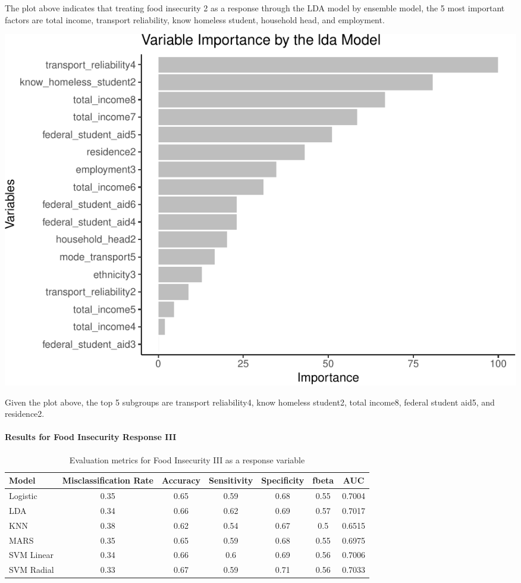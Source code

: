 \documentclass[
  10pt,
]{article}
\begin{document}
\hfill\break
The plot above indicates that treating food insecurity 2 as a response through the LDA model by ensemble model, the 5 most important factors are total income, transport reliability, know homeless student, household head, and employment.\\

\begin{center}\includegraphics{phase2_report_files/figure-latex/unnamed-chunk-24-1} \end{center}

\hfill\break
Given the plot above, the top 5 subgroups are transport reliability4, know homeless student2, total income8, federal student aid5, and residence2.\\

\hypertarget{results-for-food-insecurity-response-iii}{%
\paragraph{Results for Food Insecurity Response III}\label{results-for-food-insecurity-response-iii}}

\newline

\begin{table}[H]

\caption{\label{tab:unnamed-chunk-25}Evaluation metrics for Food Insecurity III  as a response variable}
\centering
\fontsize{12}{14}\selectfont
\begin{tabular}[t]{lcccccc}
\toprule
Model & Misclassification Rate & Accuracy & Sensitivity & Specificity & fbeta & AUC\\
\midrule
Logistic & 0.35 & 0.65 & 0.59 & 0.68 & 0.55 & 0.7004\\
LDA & 0.34 & 0.66 & 0.62 & 0.69 & 0.57 & 0.7017\\
KNN & 0.38 & 0.62 & 0.54 & 0.67 & 0.5 & 0.6515\\
MARS & 0.35 & 0.65 & 0.59 & 0.68 & 0.55 & 0.6975\\
SVM Linear & 0.34 & 0.66 & 0.6 & 0.69 & 0.56 & 0.7006\\
SVM Radial & 0.33 & 0.67 & 0.59 & 0.71 & 0.56 & 0.7033\\
\bottomrule
\end{tabular}
\end{table}
\end{document}
